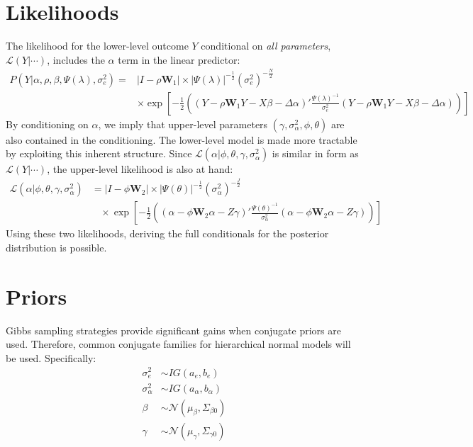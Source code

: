 \documentclass[11pt]{article}
\begin{document}
\section{Likelihoods}
The likelihood for the lower-level outcome $Y$ conditional on \textit{all parameters}, $\mathcal{L}(Y | \cdots)$, includes the $\alpha$ term in the linear predictor:
\begin{equation}
\begin{split}
P(Y|\alpha, \rho, \beta, \Psi(\lambda), \sigma^2_e) =
&|I - \rho \mathbf{W}_1|
\times |\Psi(\lambda)|^{-\frac{1}{2}} \left( \sigma^2_e \right)^{-\frac{N}{2}}
\\
&\times \exp \left[ -\frac{1}{2}
\left(
(Y - \rho \mathbf{W}_1 Y - X\beta - \Delta\alpha)'\frac{\Psi(\lambda)^{-1}}{\sigma^2_e}(Y - \rho \mathbf{W}_1 Y - X\beta - \Delta\alpha)
\right)
\right]
\end{split}
\end{equation}
By conditioning on $\alpha$, we imply that upper-level parameters $(\gamma, \sigma^2_\alpha, \phi, \theta)$ are also contained in the conditioning. The lower-level model is made more tractable by exploiting this inherent structure. Since $\mathcal{L}(\alpha | \phi, \theta, \gamma, \sigma^2_\alpha)$ is similar in form as $\mathcal{L}(Y|\cdots)$, the upper-level likelihood is also at hand:
\begin{equation}
\begin{split}
\mathcal{L}(\alpha | \phi, \theta, \gamma, \sigma^2_\alpha) &=
|I - \phi\mathbf{W}_2|
\times |\Psi(\theta)|^{-\frac{1}{2}}\left(\sigma^2_\alpha\right)^{-\frac{J}{2}}
\\
&~ ~ ~ ~ \times \exp \left[ -\frac{1}{2} \left(
(\alpha - \phi \mathbf{W}_2\alpha - Z\gamma)'
\frac{\Psi(\theta)^{-1}}{\sigma^2_\alpha}
(\alpha - \phi \mathbf{W}_2\alpha - Z\gamma)
\right) \right]
\end{split}
\end{equation}
Using these two likelihoods, deriving the full conditionals for the posterior distribution is possible.
\section{Priors}
Gibbs sampling strategies provide significant gains when conjugate priors are used. Therefore, common conjugate families for hierarchical normal models will be used. Specifically:
\begin{equation}
  \begin{split}
    \sigma^2_e &\sim IG(a_e, b_e) \\
    \sigma^2_\alpha &\sim IG(a_\alpha, b_\alpha) \\
    \beta &\sim \mathcal{N}(\mu_\beta, \Sigma_{\beta0})\\
    \gamma &\sim \mathcal{N}(\mu_\gamma, \Sigma_{\gamma0})\\
  \end{split}
\end{equation}
\end{document}
